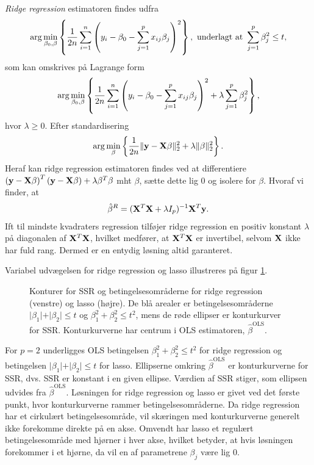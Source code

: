 \textit{Ridge regression} estimatoren findes udfra 
\begin{align} 
\arg \min_{\beta_0, \beta} \cbr{\frac{1}{2n} \sum_{i=1}^n \del{y_i - \beta_0 - \sum_{j=1}^p x_{ij} \beta_j}^2}, \ \text{underlagt at } \sum_{j=1}^p \beta_j^2 \leq t, \label{eq:2.7} 
\end{align} 
som kan omskrives på Lagrange form
\begin{align} 
\arg \min_{\beta_0, \beta} \cbr{\frac{1}{2n} \sum_{i=1}^n \del{y_i - \beta_0 - \sum_{j=1}^p x_{ij} \beta_j}^2 + \lambda \sum_{j=1}^p \beta_j^2}, 
\end{align} \label{eq:2.8} 
hvor $\lambda \geq 0$.
Efter standardisering
\begin{align*}
\arg \min_{\beta} \cbr{\frac{1}{2n} \Vert \y - \X \beta \Vert_2^2 + \lambda \Vert \beta \Vert_2^2}.
\end{align*}
Heraf kan ridge regression estimatoren findes ved at differentiere \(\del{\y - \X \beta}^T \del{\y - \X \beta} + \lambda \beta^T \beta\) mht $\beta$, sætte dette lig 0 og isolere for $\beta$. Hvoraf vi finder, at
\begin{align*} 
\hat{\beta}^R = (\mathbf{X}^T \mathbf{X} + \lambda I_p)^{-1} \mathbf{X}^T \mathbf{y}. 
\end{align*}  
Ift til mindste kvadraters regression tilføjer ridge regression en positiv konstant $\lambda$ på diagonalen af $\mathbf{X}^T \mathbf{X}$, hvilket medfører, at \(\mathbf{X}^T \mathbf{X}\) er invertibel, selvom $\mathbf{X}$ ikke har fuld rang. 
Dermed er en entydig løsning altid garanteret. 
 


Variabel udvægelsen for ridge regression og lasso illustreres på figur \ref{fig:LassoRig}.
\begin{figure}[H]
\begin{minipage}{0.5\linewidth}
\scalebox{0.8}{}
\end{minipage}
\hspace{0.3cm}
\begin{minipage}{0.5\linewidth}
\scalebox{0.8}{}
\end{minipage}
\caption{Konturer for SSR og betingelsesområderne for ridge regression (venstre) og lasso (højre). De blå arealer er betingelsesområderne $\vert \beta_1 \vert+\vert \beta_2 \vert \leq t$ og $\beta_1^2+\beta_2^2 \leq t^2$, mens de røde ellipser er konturkurver for SSR. Konturkurverne har centrum i OLS estimatoren, $\hat{\beta}^\text{OLS}$.} \label{fig:LassoRig}
\end{figure}
For $p=2$ underligges OLS betingelsen $\beta_1^2 + \beta_2^2 \leq t^2$ for ridge regression og betingelsen $\vert \beta_1 \vert + \vert \beta_2 \vert \leq t$ for lasso.
Ellipserne omkring $\hat{\beta}^{\text{OLS}}$ er konturkurverne for SSR, dvs. SSR er konstant i en given ellipse. Værdien af SSR stiger, som ellipsen udvides fra $\hat{\beta}^{\text{OLS}}$.
Løsningen for ridge regression og lasso er givet ved det første punkt, hvor konturkurverne rammer betingelsesområderne.
Da ridge regression har et cirkulært betingelsesområde, vil skæringen med konturkurverne generelt ikke forekomme direkte på en akse.
Omvendt har lasso et regulært betingelsesområde med hjørner i hver akse, hvilket betyder, at hvis løsningen forekommer i et hjørne, da vil en af parametrene $\beta_j$ være lig 0.

